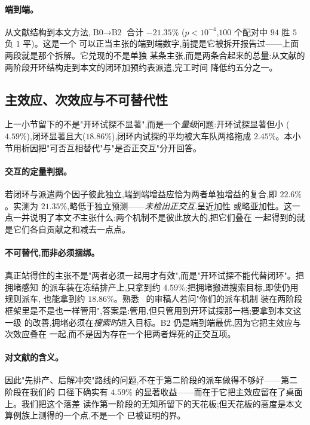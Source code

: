 \documentclass[manuscript,screen,review]{acmart}
\newcommand{\NPairs}{100}
\newcommand{\GainLoopRule}{18.86\%}      %
\newcommand{\GainProbeOpen}{4.59\%}      %
\newcommand{\GainProbeLoop}{2.45\%}      %
\newcommand{\GainEndToEnd}{21.35\%}      %
\newcommand{\PEndToEnd}{<10^{-4}}
\newcommand{\WinEndToEnd}{94}
\newcommand{\LoseEndToEnd}{5}
\newcommand{\GainIndepProduct}{22.6\%}
\begin{document}
\paragraph{端到端。}
从文献结构到本文方法,$\text{B0}\to\text{B2}$ 合计 $-\GainEndToEnd$
($p\PEndToEnd$,$\NPairs$ 个配对中 $\WinEndToEnd$ 胜 $\LoseEndToEnd$ 负 $1$ 平)。这是一个
可以正当主张的端到端数字,前提是它被拆开报告过——上面两段就是那个拆解。它兑现的不是单独
某条主张,而是两条合起来的总量:从文献的两阶段开环结构走到本文的闭环加预约表派遣,完工时间
降低约五分之一。

\subsection{主效应、次效应与不可替代性}
\label{sec:complement}

上一小节留下的不是"开环试探不显著",而是一个\emph{量级}问题:开环试探显著但小
($\GainProbeOpen$),闭环显著且大($\GainLoopRule$),闭环内试探的平均被大车队两格拖成
$\GainProbeLoop$。本小节用析因把"可否互相替代"与"是否正交互"分开回答。

\paragraph{交互的定量判据。}
若闭环与派遣两个因子彼此独立,端到端增益应恰为两者单独增益的复合,即
$\GainIndepProduct$。实测为 $\GainEndToEnd$,略低于独立预测——\emph{未检出正交互},呈近加性
或略亚加性。这一点一并说明了本文\emph{不}主张什么:两个机制不是彼此放大的,把它们叠在
一起得到的就是它们各自贡献之和减去一点点。

\paragraph{不可替代,而非必须捆绑。}
真正站得住的主张不是"两者必须一起用才有效",而是"开环试探不能代替闭环"。把拥堵感知
的派车装在冻结排产上,只拿到约 $\GainProbeOpen$;把拥堵搬进搜索目标,即使仍用规则派车,
也能拿到约 $\GainLoopRule$。熟悉~\cite{sun2023integrated} 的审稿人若问"你们的派车机制
装在两阶段框架里是不是也一样管用",答案是:管用,但只管用到开环试探那一档;要拿到本文这一级
的改善,拥堵必须在\emph{搜索时}进入目标。B2 仍是端到端最优,因为它把主效应与次效应叠在
一起,而不是因为存在一个把两者焊死的正交互项。

\paragraph{对文献的含义。}
因此"先排产、后解冲突"路线的问题,不在于第二阶段的派车做得不够好——第二阶段在我们的
口径下确实有 $\GainProbeOpen$ 的显著收益——而在于它把主效应留在了桌面上。我们把这个落差
读作第一阶段的无知所留下的天花板;但天花板的高度是本文算例族上测得的一个点,不是一个
已被证明的界。
\end{document}
